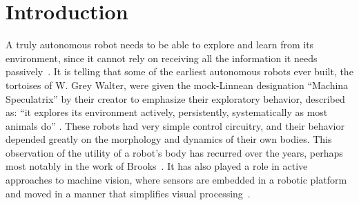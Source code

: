 
\section{Introduction}

A truly autonomous robot needs to be able to explore and learn from
its environment, since it cannot rely on receiving all the information
it needs passively~\cite{whaite97autonomous}.
It is telling that some of the earliest autonomous robots ever built,
the tortoises of W. Grey Walter, were given the mock-Linnean
designation ``Machina Speculatrix'' by their creator to emphasize their exploratory
behavior, described as: ``it explores its environment actively,
persistently, systematically as most animals do''
\cite{walter50imitation}.
These robots had very simple control circuitry, and their behavior
depended greatly on the morphology and dynamics of their own bodies.
%
This observation of the utility of a robot's body has recurred over
the years, perhaps most notably in the work of
Brooks~\cite{group-AAAI-98}.  It has also played a role in active
approaches to machine vision, where sensors are embedded in a robotic
platform and moved in a manner that simplifies visual
processing~\cite{ballard91animate}.




